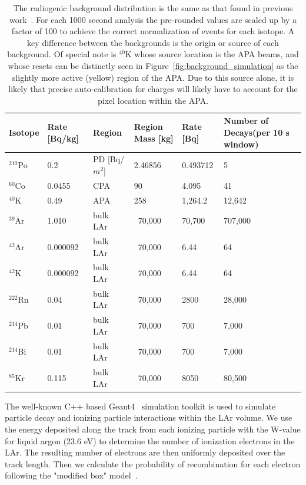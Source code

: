 \begin{table}
\begin{centering}
\begin{tabular}{|p{15mm} p{15mm} p{20mm} p{20mm} p{20mm} p{35mm} |}
 \hline
 Isotope & Rate [Bq/kg] & Region & Region Mass [kg] & Rate [Bq] & Number of Decays\newline (per 10 s window) \\ [0.5ex]
 \hline\hline
  $^{210}$Po & 0.2 & PD [Bq/$m^2$] & 2.46856 & 0.493712 & 5 \\
  $^{60}$Co & 0.0455 & CPA & 90 & 4.095 & 41 \\
  $^{40}$K & 0.49 & APA & 258 & 1,264.2 & 12,642 \\
  $^{39}$Ar & 1.010 & bulk LAr & ~70,000 & 70,700 & 707,000 \\
  $^{42}$Ar & 0.000092 & bulk LAr & ~70,000 & 6.44 & 64 \\
  $^{42}$K  & 0.000092 & bulk LAr & ~70,000 & 6.44 & 64 \\
  $^{222}$Rn & 0.04 & bulk LAr & ~70,000 & 2800 & 28,000 \\
  $^{214}$Pb & 0.01 & bulk LAr & ~70,000 & 700 & 7,000 \\
  $^{214}$Bi & 0.01 & bulk LAr & ~70,000 & 700 & 7,000 \\
  $^{85}$Kr & 0.115 & bulk LAr & ~70,000 & 8050 & 80,500 \\
 \hline
\end{tabular}
\caption{The radiogenic background distribution is the same as that found in previous work~\citep{qpix:shion}.
For each 1000 second analysis the pre-rounded values are scaled up by a factor of 100 to achieve the correct normalization of events for each isotope.
A key difference between the backgrounds is the origin or source of each background.
Of special note is $^{40}$K whose source location is the APA beams, and whose resets can be distinctly seen in Figure~\ref{fig:background_simulation} as the slightly more active (yellow) region of the APA.
Due to this source alone, it is likely that precise auto-calibration for charges will likely have to account for the pixel location within the APA.
}
\label{table:radiogenic_backgrounds}
\end{centering}
\end{table}

The well-known C++ based Geant4~\citep{geant4:AGOSTINELLI2003250} simulation toolkit is used to simulate particle decay and ionizing particle interactions within the LAr volume.
We use the energy deposited along the track from each ionizing particle with the W-value for liquid argon (23.6 eV) to determine the number of ionization electrons in the LAr.
The resulting number of electrons are then uniformly deposited over the track length.
Then we calculate the probability of recombination for each electron following the "modified box" model~\citep{2013JInst...8P8005A}.

